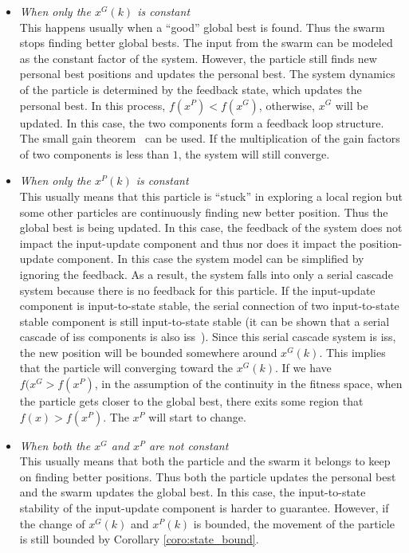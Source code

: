 \documentclass{sig-alternate}
\begin{document}
\begin{itemize}
\item \emph{When only the $ x^{G} (k) $ is constant} \\
This happens usually when a ``good'' global best is found.
Thus the swarm stops finding better global bests.
The input from the swarm can be modeled as the constant factor of the system. 
However, the particle still finds new personal best positions and updates the personal best.
The system dynamics of the particle is determined by the feedback state,
which updates the personal best.
In this process, $ f(x^{P}) < f(x^{G}) $, otherwise, $ x^{G} $ will be updated.
In this case, the two components form a feedback loop structure.
The small gain theorem~\cite{Jiang2001857} can be used.
If the multiplication of the gain factors of two components is less than $ 1 $, the system will still converge.
\item \emph{When only the $ x^{P} (k) $ is constant} \\
This usually means that this particle is ``stuck'' in exploring a local region but some other particles are continuously finding new better position. 
Thus the global best is being updated.
In this case, the feedback of the system does not impact the input-update component and thus nor does it impact the position-update component.
In this case the system model can be simplified by ignoring the feedback.
As a result, the system falls into only a serial cascade system because there is no feedback for this particle.
If the input-update component is input-to-state stable, the serial connection of two input-to-state stable component is still input-to-state stable (it can be shown that a serial cascade of iss components is also iss~\cite{khalil1996nonlinear}).
Since this serial cascade system is iss, the new position will be bounded somewhere around $ x^{G} (k) $. This implies that the particle will converging toward the $ x^{G} (k) $.
If we have  $ f(x^{G} > f(x^{P}) $, in the assumption of the continuity in the fitness space, when the particle gets closer to the global best, there exits some region that $ f(x) > f(x^{P}) $.
The $ x^{P} $ will start to change.
\item \emph{When both the $ x^{G} $ and $ x^{P} $ are not constant} \\
This usually means that both the particle and the swarm it belongs to keep on finding better positions.
Thus both the particle updates the personal best and the swarm updates the global best.
In this case, the input-to-state stability of the input-update component is harder to guarantee.
However, if the change of $ x^{G}(k) $ and $ x^{P}(k) $ is bounded, the movement of the particle is still bounded by Corollary \ref{coro:state_bound}.
\end{itemize}
\end{document}
